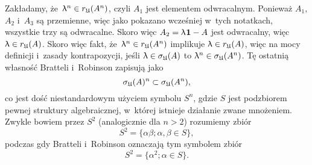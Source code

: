 \documentclass[a4paper,11pt]{article}
\numberwithin{equation}{section}
\renewcommand{\lambda}{\uplambda}
\begin{document}
Zakładamy, że~$\lambda^{ n } \in r_{ \Ufrak }( A^{ n } )$, czyli $A_{ 1 }$ jest
elementem odwracalnym. Ponieważ $A_{ 1 }$, $A_{ 2 }$ i~$A_{ 3 }$ są
przemienne, więc jako pokazano wcześniej w~tych notatkach, wszystkie trzy są
odwracalne. Skoro więc $A_{ 2 } = \lambda \HorSpaceOne \UnitAlg - A$ jest
odwracalny, więc $\lambda \in r_{ \Ufrak }( A )$. Skoro więc fakt,
że~$\lambda^{ n } \in r_{ \Ufrak }( A^{ n } )$ implikuje $\lambda \in r_{ \Ufrak }( A )$, więc na
mocy definicji i~zasady kontrapozycji, jeśli $\lambda \in \sigma_{ \Ufrak }( A )$ to
$\lambda^{ n } \in \sigma_{ \Ufrak }( A^{ n } )$. Tę ostatnią własność Bratteli i~Robinson
zapisują jako
\begin{equation}
  \label{eq:Bratteli-Robinson-Operator-Algebras-ETC-Vol-I-s01-57}
  \sigma_{ \mathfrak{U} }( A )^{ n } \subset \sigma_{ \mathfrak{U} }( A^{ n } ),
\end{equation}
co jest dość niestandardowym użyciem symbolu $S^{ n }$, gdzie $S$ jest
podzbiorem pewnej struktury algebraicznej, w~której istnieje działanie
zwane mnożeniem. Zwykle bowiem przez $S^{ 2 }$ (analogicznie dla $n > 2$)
rozumiemy zbiór
\begin{equation}
  \label{eq:Bratteli-Robinson-Operator-Algebras-ETC-Vol-I-s01-58}
  S^{ 2 } = \{ \alpha \beta; \alpha, \beta \in S \},
\end{equation}
podczas gdy Bratteli i~Robinson oznaczają tym symbolem zbiór
\begin{equation}
  \label{eq:Bratteli-Robinson-Operator-Algebras-ETC-Vol-I-s01-59}
  S^{ 2 } = \{ \alpha^{ 2 }; \alpha \in S \}.
\end{equation}

\VerSpaceFour






\newpage

\end{document}
